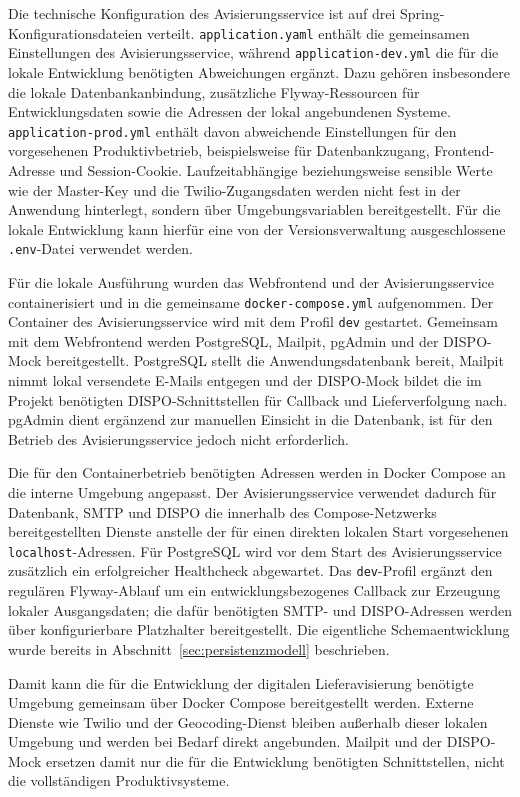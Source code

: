 \documentclass[
  12pt,
  a4paper,
  oneside
]{article}
\begin{document}
Die technische Konfiguration des Avisierungsservice ist auf drei
Spring-Konfigurationsdateien verteilt. \texttt{application.yaml} enthält die
gemeinsamen Einstellungen des Avisierungsservice, während
\texttt{application-dev.yml} die für die lokale Entwicklung benötigten
Abweichungen ergänzt. Dazu gehören insbesondere die lokale Datenbankanbindung,
zusätzliche Flyway-Ressourcen für Entwicklungsdaten sowie die Adressen der
lokal angebundenen Systeme. \texttt{application-prod.yml} enthält davon
abweichende Einstellungen für den vorgesehenen Produktivbetrieb,
beispielsweise für Datenbankzugang, Frontend-Adresse und Session-Cookie.
Laufzeitabhängige beziehungsweise sensible Werte wie der Master-Key und die
Twilio-Zugangsdaten werden nicht fest in der Anwendung hinterlegt, sondern
über Umgebungsvariablen bereitgestellt. Für die lokale Entwicklung kann
hierfür eine von der Versionsverwaltung ausgeschlossene \texttt{.env}-Datei
verwendet werden.

Für die lokale Ausführung wurden das Webfrontend und der Avisierungsservice
containerisiert und in die gemeinsame \texttt{docker-compose.yml} aufgenommen.
Der Container des Avisierungsservice wird mit dem Profil \texttt{dev} gestartet.
Gemeinsam mit dem Webfrontend werden PostgreSQL, Mailpit, pgAdmin und der
DISPO-Mock bereitgestellt. PostgreSQL stellt die Anwendungsdatenbank bereit,
Mailpit nimmt lokal versendete E-Mails entgegen und der DISPO-Mock bildet die im
Projekt benötigten DISPO-Schnittstellen für Callback und Lieferverfolgung nach.
pgAdmin dient ergänzend zur manuellen Einsicht in die Datenbank, ist für den
Betrieb des Avisierungsservice jedoch nicht erforderlich.

Die für den Containerbetrieb benötigten Adressen werden in Docker Compose an
die interne Umgebung angepasst. Der Avisierungsservice verwendet dadurch für
Datenbank, SMTP und DISPO die innerhalb des Compose-Netzwerks bereitgestellten
Dienste anstelle der für einen direkten lokalen Start vorgesehenen
\texttt{localhost}-Adressen. Für PostgreSQL wird vor dem Start des
Avisierungsservice zusätzlich ein erfolgreicher Healthcheck abgewartet. Das
\texttt{dev}-Profil ergänzt den regulären Flyway-Ablauf um ein
entwicklungsbezogenes Callback zur
Erzeugung lokaler Ausgangsdaten; die dafür benötigten SMTP- und DISPO-Adressen
werden über konfigurierbare Platzhalter bereitgestellt. Die eigentliche
Schemaentwicklung wurde bereits in Abschnitt~\ref{sec:persistenzmodell}
beschrieben.

Damit kann die für die Entwicklung der digitalen Lieferavisierung benötigte
Umgebung gemeinsam über Docker Compose bereitgestellt werden. Externe Dienste
wie Twilio und der Geocoding-Dienst bleiben außerhalb dieser lokalen Umgebung
und werden bei Bedarf direkt angebunden. Mailpit und der DISPO-Mock ersetzen
damit nur die für die Entwicklung benötigten Schnittstellen, nicht die
vollständigen Produktivsysteme.

\clearpage
\printbibliography[heading=bibintoc,title={Literaturverzeichnis}]
\end{document}
